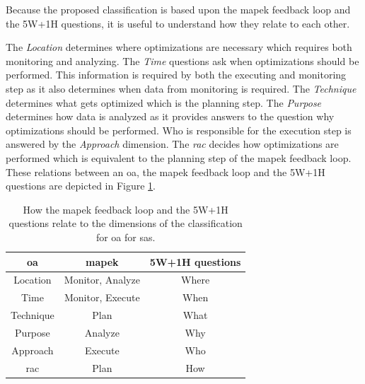 \noindent Because the proposed classification is based upon the \acrshort{mapek} feedback loop and the 5W+1H questions,
it is useful to understand how they relate to each other.

\noindent The \textit{Location} determines where optimizations are necessary which requires both monitoring and analyzing.
The \textit{Time} questions ask when optimizations should be performed.
This information is required by both the executing and monitoring step as it also determines when data from monitoring is required.
The \textit{Technique} determines what gets optimized which is the planning step.
The \textit{Purpose} determines how data is analyzed as it provides answers to the question why optimizations should be performed.
Who is responsible for the execution step is answered by the \textit{Approach} dimension.
The \textit{\acrshort{rac}} decides how optimizations are performed which is equivalent to the planning step of the \acrshort{mapek} feedback loop.
These relations between an \acrshort{oa}, the \acrshort{mapek} feedback loop and the 5W+1H questions are depicted in Figure \ref{tab:MapeQuestionsOA}.

\begin{table}[h]
    \centering
    \begin{tabular}{|c|c|c|}
        \hline
        \textbf{\acrshort{oa}} & \textbf{\acrshort{mapek}} & \textbf{5W+1H questions} \\
        \hline
        \hline
        Location & Monitor, Analyze & Where \\
        \hline
        Time & Monitor, Execute & When \\
        \hline
        Technique & Plan & What \\
        \hline
        Purpose & Analyze & Why \\
        \hline
        Approach & Execute & Who \\
        \hline
        \acrshort{rac} & Plan & How \\
        \hline
    \end{tabular}
    \caption{How the \acrshort{mapek} feedback loop \cite*{VisionOfAutonomicComputing}
    and the 5W+1H questions \cite{LandscapeAndResearchChallenges}
    relate to the dimensions of the classification for \acrshort{oa} for \acrshort{sas}.}
    \label{tab:MapeQuestionsOA}
\end{table}


